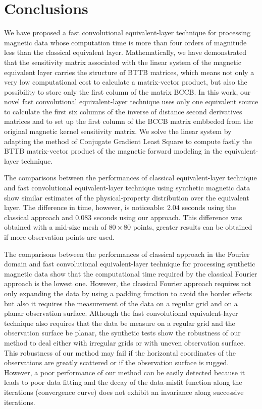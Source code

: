 \section{Conclusions}

We have proposed  a fast convolutional equivalent-layer technique for processing magnetic data 
whose computation time is more than four orders of magnitude less than the classical equivalent layer.
Mathematically, we have  demonstrated that the sensitivity matrix associated with the linear system of the magnetic equivalent layer carries the structure of BTTB matrices, which means not only a very low computational cost to calculate a matrix-vector product, but also the possibility to store only the first column of the matrix BCCB. 
In this work, our novel fast convolutional equivalent-layer technique  uses only one equivalent source to calculate the first six columns of the inverse of distance second derivatives matrices and to set up the first column of the BCCB matrix embbeded from the original magnetic kernel sensitivity matrix.
We solve the linear system by adapting the method of Conjugate Gradient Least Square to compute fastly the BTTB matrix-vector product of the magnetic forward modeling in the equivalent-layer technique.

The comparisons between the performances of classical equivalent-layer technique  and  fast convolutional equivalent-layer technique using synthetic magnetic data show similar estimates of the physical-property distribution over the equivalent layer.
The difference in time, however, is noticeable: $2.04$ seconds using the classical approach and $0.083$ seconds using our approach. This difference was obtained with a mid-size mesh of $80 \times 80$ points, greater results can be obtained if more observation points are used.

The comparisons between the performances of classical approach in the Fourier domain and fast convolutional equivalent-layer technique for processing synthetic magnetic data show that the computational time required by the classical Fourier approach is the lowest one.
However, the classical Fourier approach requires not only expanding the data by using a padding function to avoid the border effects but also it requires the measurement of the data on a regular grid and on a planar observation surface.
Although the fast convolutional equivalent-layer technique  also requires that the data be measure on a regular grid and the observation surface be planar, the synthetic tests show the robustness of our method to deal  either with irregular grids or with uneven observation surface.
This robustness of our method may fail if the horizontal coordinates of the observations are greatly scattered
or if the observation surface is rugged.
However, a poor performance of our method  can be easily detected  because it leads to poor data fitting and the decay of the data-misfit function along the iterations (convergence curve) does not exhibit an invariance along successive iterations. 

